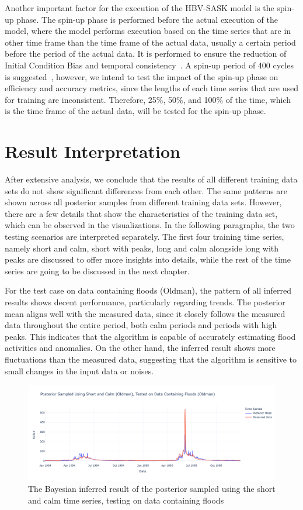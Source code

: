 Another important factor for the execution of the HBV-SASK model is the spin-up phase. The spin-up phase is performed before the actual execution of the model, where the model performs execution based on the time series that are in other time frame than the time frame of the actual data, usually a certain period before the period of the actual data. It is performed to ensure the reduction of Initial Condition Bias and temporal consistency~\cite{spin_up_explanation}. A spin-up period of 400 cycles is suggested~\cite{spin_up_explanation}, however, we intend to test the impact of the spin-up phase on efficiency and accuracy metrics, since the lengths of each time series that are used for training are inconsistent. Therefore, 25\%, 50\%, and 100\% of the time, which is the time frame of the actual data, will be tested for the spin-up phase.

\section{Result Interpretation}
After extensive analysis, we conclude that the results of all different training data sets do not show significant differences from each other. The same patterns are shown across all posterior samples from different training data sets. However, there are a few details that show the characteristics of the training data set, which can be observed in the visualizations. In the following paragraphs, the two testing scenarios are interpreted separately. The first four training time series, namely short and calm, short with peaks, long and calm alongside long with peaks are discussed to offer more insights into details, while the rest of the time series are going to be discussed in the next chapter.

For the test case on data containing floods (Oldman), the pattern of all inferred results shows decent performance, particularly regarding trends. The posterior mean aligns well with the measured data, since it closely follows the measured data throughout the entire period, both calm periods and periods with high peaks. This indicates that the algorithm is capable of accurately estimating flood activities and anomalies. On the other hand, the inferred result shows more fluctuations than the measured data, suggesting that the algorithm is sensitive to small changes in the input data or noises.

\begin{figure}[H]
    \centering
    \includegraphics[width=.7\textwidth]{figures/time_series_analysis/ts_int/0_1.png}
    \captionsetup{width=.8\textwidth}
    \caption{The Bayesian inferred result of the posterior sampled using the short and calm time series, testing on data containing floods}
    \label{fig:enter-label}
\end{figure}

